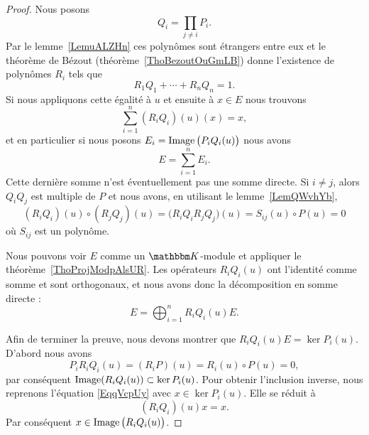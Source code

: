 \begin{proof}
    Nous posons
    \begin{equation}
        Q_i=\prod_{j\neq i}P_i.
    \end{equation}
    Par le lemme~\ref{LemuALZHn} ces polynômes sont étrangers entre eux et le théorème de Bézout (théorème~\ref{ThoBezoutOuGmLB}) donne l'existence de polynômes \( R_i\) tels que
    \begin{equation}
        R_1Q_1+\cdots+R_nQ_n=1.
    \end{equation}
    Si nous appliquons cette égalité à \( u\) et ensuite à \( x\in E\) nous trouvons
    \begin{equation}        \label{EqqVcpUy}
        \sum_{i=1}^n(R_iQ_i)(u)(x)=x,
    \end{equation}
    et en particulier si nous posons \( E_i=\operatorname{Image}\big(P_iQ_i(u)\big)\) nous avons
    \begin{equation}
        E=\sum_{i=1}^nE_i.
    \end{equation}
    Cette dernière somme n'est éventuellement pas une somme directe. Si \( i\neq j\), alors \( Q_iQ_j\) est multiple de \( P\) et nous avons, en utilisant le lemme~\ref{LemQWvhYb},
    \begin{equation}
        (R_iQ_i)(u)\circ (R_jQ_j)(u)=\big( R_iQ_iR_jQ_j \big)(u)=S_{ij}(u)\circ P(u)=0
    \end{equation}
    où \( S_{ij}\) est un polynôme.

    Nous pouvons voir \( E\) comme un \( \eK\)-module et appliquer le théorème~\ref{ThoProjModpAlsUR}. Les opérateurs \( R_iQ_i(u)\) ont l'identité comme somme et sont orthogonaux, et nous avons donc la décomposition en somme directe :
    \begin{equation}
        E=\bigoplus_{i=1}^nR_iQ_i(u)E.
    \end{equation}

    Afin de terminer la preuve, nous devons montrer que \( R_iQ_i(u)E=\ker P_i(u)\). D'abord nous avons
    \begin{equation}
        P_iR_iQ_i(u)=(R_iP)(u)=R_i(u)\circ P(u)=0,
    \end{equation}
    par conséquent \( \operatorname{Image}(R_iQ_i(u))\subset \ker P_i(u)\). Pour obtenir l'inclusion inverse, nous reprenons l'équation \eqref{EqqVcpUy} avec \( x\in\ker P_i(u)\). Elle se réduit à
    \begin{equation}
        (R_iQ_i)(u)x=x.
    \end{equation}
    Par conséquent \( x\in\operatorname{Image}\big( R_iQ_i(u) \big)\).
\end{proof}

